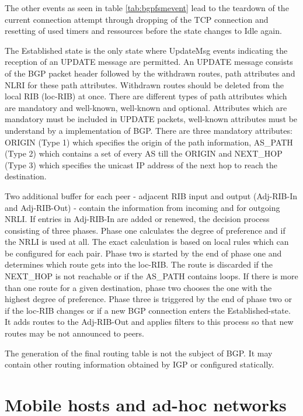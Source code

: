 \documentclass{acm_proc_article-sp}
\begin{document}
The other events as seen in table \ref{tab:bgpfsmevent} lead to the teardown of the current connection attempt through dropping of the TCP connection and resetting of used timers and ressources before the state changes to Idle again.

The Established state is the only state where UpdateMsg events indicating the reception of an UPDATE message are permitted. An UPDATE message consists of the BGP packet header followed by the withdrawn routes, path attributes and NLRI for these path attributes. Withdrawn routes should be deleted from the local RIB (loc-RIB) at once. There are different types of path attributes which are mandatory and well-known, well-known and optional. Attributes which are mandatory must be included in UPDATE packets, well-known attributes must be understand by a implementation of BGP. There are three mandatory attributes: ORIGIN (Type 1) which specifies the origin of the path information, AS\_PATH (Type 2) which contains a set of every AS till the ORIGIN and NEXT\_HOP (Type 3) which specifies the unicast IP address of the next hop to reach the destination.

Two additional buffer for each peer - adjacent RIB input and output (Adj-RIB-In and Adj-RIB-Out) - contain the information from incoming and for outgoing NRLI. If entries in Adj-RIB-In are added or renewed, the decision process consisting of three phases. Phase one calculates the degree of preference and if the NRLI is used at all. The exact calculation is based on local rules which can be configured for each pair. Phase two is started by the end of phase one and determines which route gets into the loc-RIB. The route is discarded if the NEXT\_HOP is not reachable or if the AS\_PATH contains loops. If there is more than one route for a given destination, phase two chooses the one with the highest degree of preference. Phase three is triggered by the end of phase two or if the loc-RIB changes or if a new BGP connection enters the Established-state. It adds routes to the Adj-RIB-Out and applies filters to this process so that new routes may be not announced to peers.

The generation of the final routing table is not the subject of BGP. It may contain other routing information obtained by IGP or configured statically.

\section{Mobile hosts and ad-hoc networks}
\end{document}
